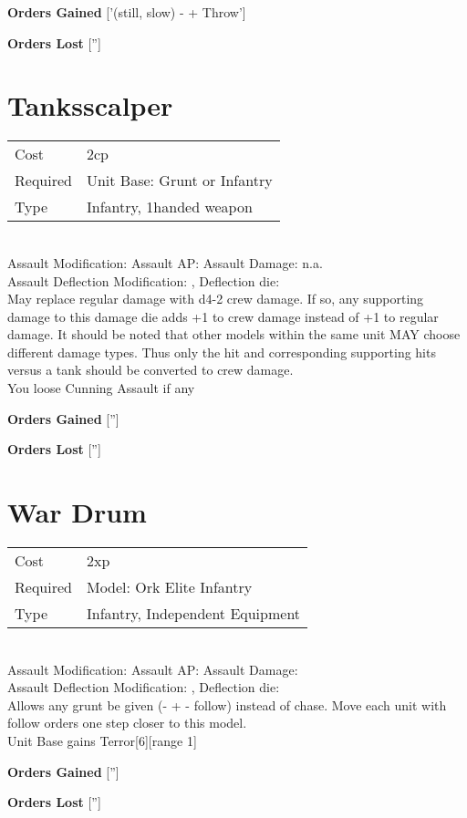 {\bf Orders Gained}
['(still, slow) - + Throw']

{\bf Orders Lost}
['']
\section{ Tanksscalper }

\begin{tabular}{ll}
    Cost & 2cp \\
    Required & Unit Base: Grunt or Infantry\\
    Type & Infantry, 1handed weapon\\
\end{tabular}
\ \\
Assault Modification:  Assault AP:  Assault Damage: n.a.\\
Assault Deflection Modification: , Deflection die:  \\
May replace regular damage with d4-2 crew damage. If so, any supporting damage to this damage die adds +1 to crew damage instead of +1 to regular damage. It should be noted that other models within the same unit MAY choose different damage types. Thus only the hit and corresponding supporting hits versus a tank should be converted to crew damage. \\ You loose Cunning Assault if any



{\bf Orders Gained}
['']

{\bf Orders Lost}
['']
\section{ War Drum }

\begin{tabular}{ll}
    Cost & 2xp \\
    Required & Model: Ork Elite Infantry\\
    Type & Infantry, Independent Equipment\\
\end{tabular}
\ \\
Assault Modification:  Assault AP:  Assault Damage: \\
Assault Deflection Modification: , Deflection die:  \\


Allows any grunt be given (- + - follow) instead of chase. Move each unit with follow orders one step closer to this model.\\ Unit Base gains Terror[6][range 1]

{\bf Orders Gained}
['']

{\bf Orders Lost}
['']
